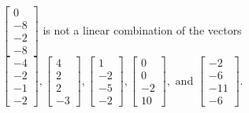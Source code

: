 \begin{exercise}
\begin{exerciseStatement}
  \end{exerciseStatement}
  \begin{exerciseAnswer}
   \(\left[\begin{array}{c}
0 \\
-8 \\
-2 \\
-8
\end{array}\right]\) 
  	 is not  
	a linear combination of the vectors \(\left[\begin{array}{c}
-4 \\
-2 \\
-1 \\
-2
\end{array}\right] , \left[\begin{array}{c}
4 \\
2 \\
2 \\
-3
\end{array}\right] , \left[\begin{array}{c}
1 \\
-2 \\
-5 \\
-2
\end{array}\right] , \left[\begin{array}{c}
0 \\
0 \\
-2 \\
10
\end{array}\right] , \text{ and } \left[\begin{array}{c}
-2 \\
-6 \\
-11 \\
-6
\end{array}\right]\).

	
  


  \end{exerciseAnswer}
\end{exercise}